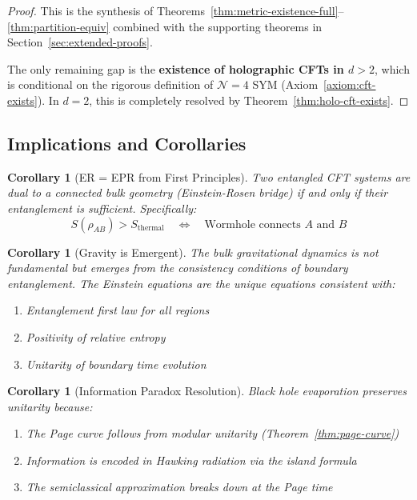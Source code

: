 \documentclass[12pt,a4paper]{article}
\newtheorem{corollary}[theorem]{Corollary}
\begin{document}
\begin{proof}
This is the synthesis of Theorems~\ref{thm:metric-existence-full}--\ref{thm:partition-equiv} combined with the supporting theorems in Section~\ref{sec:extended-proofs}.

The only remaining gap is the \textbf{existence of holographic CFTs in $d > 2$}, which is conditional on the rigorous definition of $\mathcal{N}=4$ SYM (Axiom~\ref{axiom:cft-exists}). In $d = 2$, this is completely resolved by Theorem~\ref{thm:holo-cft-exists}.
\end{proof}

\subsection{Implications and Corollaries}

\begin{corollary}[ER = EPR from First Principles]
Two entangled CFT systems are dual to a connected bulk geometry (Einstein-Rosen bridge) if and only if their entanglement is sufficient. Specifically:
\begin{equation}
S(\rho_{AB}) > S_{\text{thermal}} \quad \Longleftrightarrow \quad \text{Wormhole connects } A \text{ and } B
\end{equation}
\end{corollary}

\begin{corollary}[Gravity is Emergent]
The bulk gravitational dynamics is not fundamental but emerges from the consistency conditions of boundary entanglement. The Einstein equations are the unique equations consistent with:
\begin{enumerate}
    \item Entanglement first law for all regions
    \item Positivity of relative entropy
    \item Unitarity of boundary time evolution
\end{enumerate}
\end{corollary}

\begin{corollary}[Information Paradox Resolution]
Black hole evaporation preserves unitarity because:
\begin{enumerate}
    \item The Page curve follows from modular unitarity (Theorem~\ref{thm:page-curve})
    \item Information is encoded in Hawking radiation via the island formula
    \item The semiclassical approximation breaks down at the Page time
\end{enumerate}
\end{corollary}
\end{document}

